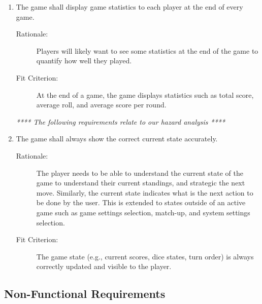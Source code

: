\begin{enumerate}[label=R\arabic*, start=1, left=0pt]
    \item \label{R16} The game shall display game statistics to each player at the end of every game.
    \begin{description}
        \item[Rationale:] Players will likely want to see some statistics at the end of the game to quantify how well they played.
        \item[Fit Criterion:] At the end of a game, the game displays statistics such as total score, average roll, and average score per round.
    \end{description}

    \textit{**** The following requirements relate to our hazard analysis ****}
    \item \label{R17} The game shall always show the correct current state accurately.
    \begin{description}
        \item[Rationale:] The player needs to be able to understand the current state of the game to understand their current standings, and strategic the next move. Similarly, the current state indicates what is the next action to be done by the user. This is extended to states outside of an active game such as game settings selection, match-up, and system settings selection.
        \item[Fit Criterion:] The game state (e.g., current scores, dice states, turn order) is always correctly updated and visible to the player.
    \end{description}

\end{enumerate}

\subsection{Non-Functional Requirements}

